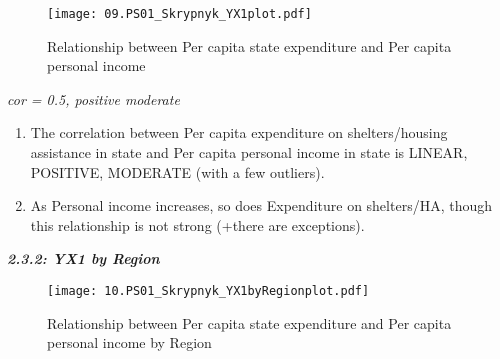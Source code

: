 \documentclass[12pt,letterpaper]{article}
\begin{document}
\begin{figure}[H]
	\centering
	\caption{\footnotesize Relationship between Per capita state expenditure and Per capita personal income}
	\label{fig:plot_9}
	\texttt{[image: 09.PS01\_Skrypnyk\_YX1plot.pdf]}
\end{figure}

\noindent 
\centering
\textit{cor = 0.5, positive moderate} 

\begin{enumerate}[$\circ$]
	\item The correlation between Per capita expenditure on shelters/housing assistance in state and Per capita personal income in state is LINEAR, POSITIVE, MODERATE (with a few outliers).
	\item As Personal income increases, so does Expenditure on shelters/HA, though this relationship is not strong (+there are exceptions).
	\vspace{5cm}
\end{enumerate}

\noindent \begin{center}
	\textbf {\textit{2.3.2: YX1 by Region}}
\end{center}

\begin{figure}[H]
	\centering
	\caption{\footnotesize Relationship between Per capita state expenditure and Per capita personal income by Region}
	\label{fig:plot_10}
	\texttt{[image: 10.PS01\_Skrypnyk\_YX1byRegionplot.pdf]}
\end{figure}
\end{document}
